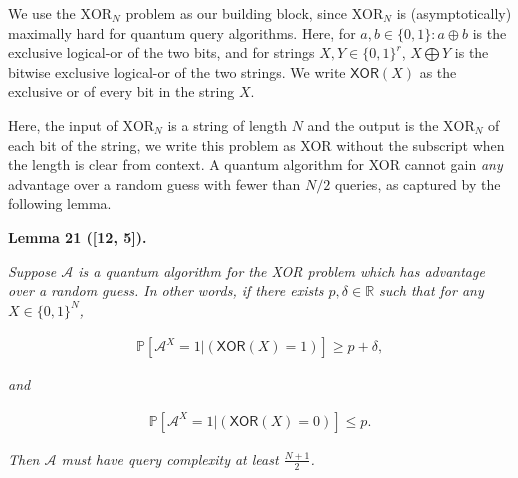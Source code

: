 



We use the ${\text{XOR}}_{N}$ problem as our building block, since ${\text{XOR}}_{N}$ is (asymptotically) maximally hard for quantum query algorithms. Here, for $a,b\in\{0,1\}:a\oplus b$ is the exclusive logical-or of the two bits, and for strings $X,Y\in\{0,1\}^{r}$, $X\bigoplus Y$ is the bitwise exclusive logical-or of the two strings. We write $\mathsf{XOR}(X)$ as the exclusive or of every bit in the string $X$.\par




Here, the input of ${\text{XOR}}_{N}$ is a string of length $N$ and the output is the ${\text{XOR}}_{N}$ of each bit of the string, we write this problem as XOR without the subscript when the length is clear from context. A quantum algorithm for XOR cannot gain \emph{any} advantage over a random guess with fewer than $N/2$ queries, as captured by the following lemma.\par





\par\medskip\noindent\textbf{
\textbf{Lemma 21}\textbf{ }([12, 5])\textbf{.}
}\par



\emph{Suppose $\mathcal{A}$ is a quantum algorithm for the XOR problem which has advantage over a random guess. In other words, if there exists $p,\delta\in\mathbb{R}$ such that for any $X\in\{0,1\}^{N}$,}\par


\[\begin{gathered}
\mathbb{P}[\mathcal{A}^{X}=1|(\mathsf{XOR}(X)=1)]\geq p+\delta,
\end{gathered}\]


\emph{and}\par


\[\begin{gathered}
\mathbb{P}[\mathcal{A}^{X}=1|(\mathsf{XOR}(X)=0)]\leq p.
\end{gathered}\]


\emph{Then $\mathcal{A}$ must have query complexity at least $\frac{N+1}{2}$.}\par






